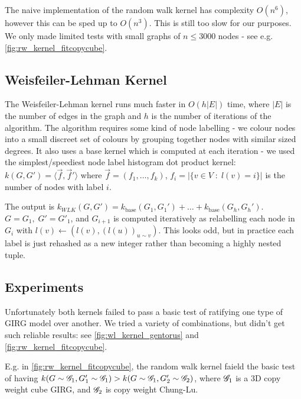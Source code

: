 The naive implementation of the random walk kernel has complexity $O(n^6)$, however this can be sped up to $O(n^3)$. This is still too slow for our purposes. We only made limited tests with small graphs of $n \leq 3000$ nodes - see e.g. \cref{fig:rw_kernel_fitcopycube}.

\subsection{Weisfeiler-Lehman Kernel}
The Weisfeiler-Lehman kernel runs much faster in $O(h|E|)$ time, where $|E|$ is the number of edges in the graph and $h$ is the number of iterations of the algorithm. The algorithm requires some kind of node labelling - we colour nodes into a small discreet set of colours by grouping together nodes with similar sized degrees. It also uses a base kernel which is computed at each iteration - we used the simplest/speediest node label histogram dot product kernel: $k(G, G') = \langle \vec{f}, \vec{f}' \rangle$ where $\vec{f} = (f_1, \dots, f_k)$, $f_i = |\{ v \in V \;:\; l(v) = i\}|$ is the number of nodes with label $i$.

The output is $k_{WLK}(G, G') = k_{\text{base}}(G_1, G_1') + \dots + k_{\text{base}}(G_h, G_h')$. $G=G_1,\; G' = G'_1$, and $G_{i+1}$ is computed iteratively as relabelling each node in $G_i$ with $l(v) \gets (l(v), (l(u))_{u \sim v})$. This looks odd, but in practice each label is just rehashed as a new integer rather than becoming a highly nested tuple.



\subsection{Experiments}

Unfortunately both kernels failed to pass a basic test of ratifying one type of GIRG model over another. We tried a variety of combinations, but didn't get such reliable results: see \cref{fig:wl_kernel_gentorus} and \cref{fig:rw_kernel_fitcopycube}.

E.g. in \cref{fig:rw_kernel_fitcopycube}, the random walk kernel faield the basic test of having $k(G \sim \mathscr{G}_1, G'_1 \sim \mathscr{G}_1) > k(G \sim \mathscr{G}_1, G'_2 \sim \mathscr{G}_2)$, where $\mathscr{G}_1$ is a 3D copy weight cube GIRG, and $\mathscr{G}_2$ is copy weight Chung-Lu.

